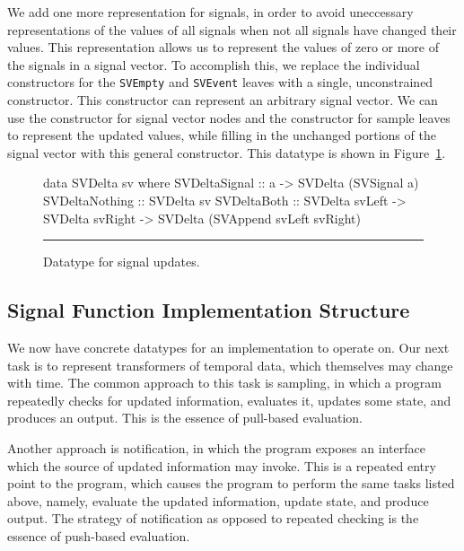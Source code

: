 We add one more representation for signals, in order to avoid uneccessary
representations of the values of all signals when not all signals have changed
their values. This representation allows us to represent the values of zero or
more of the signals in a signal vector. To accomplish this, we replace the
individual constructors for the {\tt SVEmpty} and {\tt SVEvent} leaves with %
a single, unconstrained constructor. This constructor can represent an arbitrary
signal vector. We can use the constructor for signal vector nodes and the 
constructor for sample leaves to represent the updated values, while filling
in the unchanged portions of the signal vector with this general constructor.
This datatype is shown in Figure~\ref{figure:signal_update_datatype}.

\begin{figure}
\begin{code}
data SVDelta sv where
  SVDeltaSignal  ::    a
                    -> SVDelta (SVSignal a)
  SVDeltaNothing ::    SVDelta sv
  SVDeltaBoth    ::    SVDelta svLeft
                    -> SVDelta svRight
                    -> SVDelta (SVAppend svLeft svRight)
\end{code}
\hrule
\caption{Datatype for signal updates.}
\label{figure:signal_update_datatype}
\end{figure}

\subsection{Signal Function Implementation Structure}
\label{subsection:Implementation-Signal_Functions-Signal_Function_Implementation_Structure}

We now have concrete datatypes for an implementation to operate on. Our next
task is to represent transformers of temporal data, which themselves may change
with time. The common approach to this task is sampling, in which a program
repeatedly checks for updated information, evaluates it, updates some state,
and produces an output. This is the essence of pull-based evaluation.

Another approach is notification, in which the program exposes an interface
which the source of updated information may invoke. This is a repeated entry
point to the program, which causes the program to perform the same tasks
listed above, namely, evaluate the updated information, update state, and
produce output. The strategy of notification as opposed to repeated checking is
the essence of push-based evaluation.

